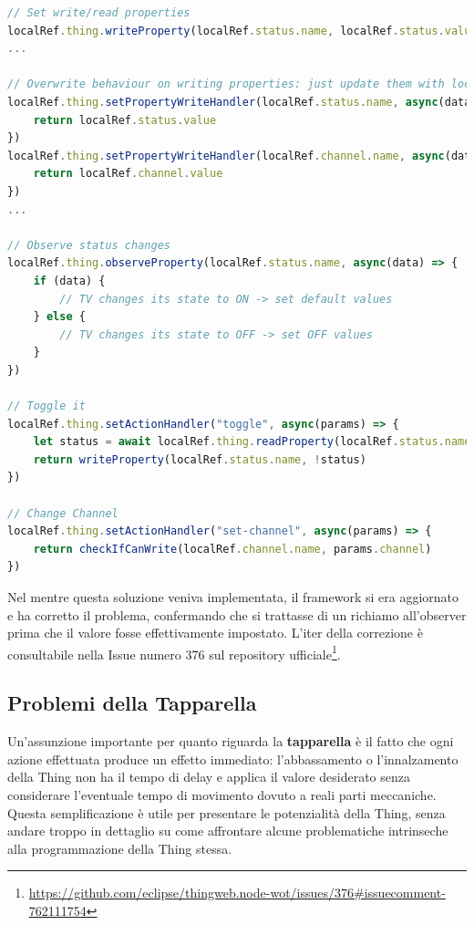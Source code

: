 \documentclass[12pt,a4paper,openright,oneside]{report}
\begin{document}
\begin{lstlisting}[language=JavaScript,caption={Solzuione definitiva per la dipendenza tra proprietà della Thing},label=lst:solution2]
// Set write/read properties
localRef.thing.writeProperty(localRef.status.name, localRef.status.value)
...

// Overwrite behaviour on writing properties: just update them with local data
localRef.thing.setPropertyWriteHandler(localRef.status.name, async(data) => {
	return localRef.status.value
})
localRef.thing.setPropertyWriteHandler(localRef.channel.name, async(data) => {
	return localRef.channel.value
})
...

// Observe status changes
localRef.thing.observeProperty(localRef.status.name, async(data) => {
	if (data) {
		// TV changes its state to ON -> set default values
	} else {
		// TV changes its state to OFF -> set OFF values
	}
})

// Toggle it
localRef.thing.setActionHandler("toggle", async(params) => {
	let status = await localRef.thing.readProperty(localRef.status.name)
	return writeProperty(localRef.status.name, !status)
})

// Change Channel
localRef.thing.setActionHandler("set-channel", async(params) => {
	return checkIfCanWrite(localRef.channel.name, params.channel)
})
\end{lstlisting}

Nel mentre questa soluzione veniva implementata, il framework si era aggiornato e ha corretto il problema, confermando che si trattasse di un richiamo all'observer prima che il valore fosse effettivamente impostato. L'iter della correzione è consultabile nella Issue numero 376 sul repository ufficiale\footnote{\url{https://github.com/eclipse/thingweb.node-wot/issues/376\#issuecomment-762111754}}.

\subsection{Problemi della Tapparella}
Un'assunzione importante per quanto riguarda la \textbf{tapparella} è il fatto che ogni azione effettuata produce un effetto immediato: l'abbassamento o l'innalzamento della Thing non ha il tempo di delay e applica il valore desiderato senza considerare l'eventuale tempo di movimento dovuto a reali parti meccaniche. Questa semplificazione è utile per presentare le potenzialità della Thing, senza andare troppo in dettaglio su come affrontare alcune problematiche intrinseche alla programmazione della Thing stessa.\\
\end{document}
